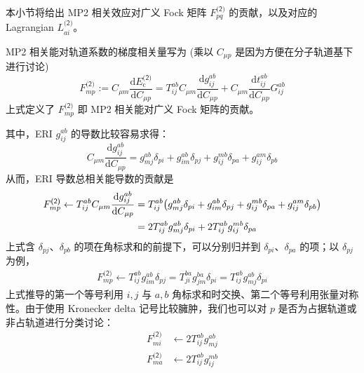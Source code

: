 本小节将给出 MP2 相关效应对广义 Fock 矩阵 $F_{pq}^\textsf{(2)}$ 的贡献，以及对应的 Lagrangian $L_{ai}^\textsf{(2)}$。

MP2 相关能对轨道系数的梯度相关量写为 (乘以 $C_{\mu p}$ 是因为方便在分子轨道基下进行讨论)
\begin{equation}
  \label{eq.3.def-fock-cmp2}
  F_{mp}^\textsf{(2)} := C_{\mu m} \frac{\mathrm{d} E_\mathrm{c}^\textsf{(2)}}{\mathrm{d} C_{\mu p}} = T_{ij}^{ab} C_{\mu m} \frac{\mathrm{d} g_{ij}^{ab}}{\mathrm{d} C_{\mu p}} + C_{\mu m} \frac{\mathrm{d} t_{ij}^{ab}}{\mathrm{d} C_{\mu p}} G_{ij}^{ab}
\end{equation}
上式定义了 $F_{mp}^\textsf{(2)}$ 即 MP2 相关能对广义 Fock 矩阵的贡献。

其中，ERI $g_{ij}^{ab}$ 的导数比较容易求得：
\begin{equation}
  C_{\mu m} \frac{\mathrm{d} g_{ij}^{ab}}{\mathrm{d} C_{\mu p}} = g_{mj}^{ab} \delta_{pi} + g_{im}^{ab} \delta_{pj} + g_{ij}^{mb} \delta_{pa} + g_{ij}^{am} \delta_{pb}
\end{equation}
从而，ERI 导数总相关能导数的贡献是
\begin{align}
  F_{mp}^\textsf{(2)} \leftarrow T_{ij}^{ab} C_{\mu m} \frac{\mathrm{d} g_{ij}^{ab}}{\mathrm{d} C_{\mu p}} &= T_{ij}^{ab} \big( g_{mj}^{ab} \delta_{pi} + g_{im}^{ab} \delta_{pj} + g_{ij}^{mb} \delta_{pa} + g_{ij}^{am} \delta_{pb} \big) \notag\\
  &= 2 T_{ij}^{ab} g_{mj}^{ab} \delta_{pi} + 2 T_{ij}^{ab} g_{ij}^{mb} \delta_{pa}
\end{align}
上式含 $\delta_{pj}$、$\delta_{pb}$ 的项在角标求和的前提下，可以分别归并到 $\delta_{pi}$、$\delta_{pa}$ 的项；以 $\delta_{pj}$ 为例，
\begin{align*}
  F_{mp}^\textsf{(2)} \leftarrow T_{ij}^{ab} g_{im}^{ab} \delta_{pj} = T_{ji}^{ba} g_{jm}^{ba} \delta_{pi} = T_{ij}^{ab} g_{mj}^{ab} \delta_{pi}
\end{align*}
上式推导的第一个等号利用 $i, j$ 与 $a, b$ 角标求和时交换、第二个等号利用张量对称性。由于使用 Kronecker delta 记号比较臃肿，我们也可以对 $p$ 是否为占据轨道或非占轨道进行分类讨论：
\begin{align}
  \label{eq.3.fock-cmp2-part1-mi}
  F_{mi}^\textsf{(2)} &\leftarrow 2 T_{ij}^{ab} g_{mj}^{ab} \\
  \label{eq.3.fock-cmp2-part1-ma}
  F_{ma}^\textsf{(2)} &\leftarrow 2 T_{ij}^{ab} g_{ij}^{mb}
\end{align}

